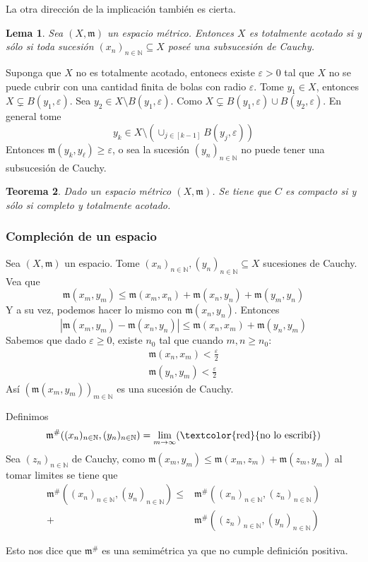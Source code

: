 \documentclass[12pt]{article}
\theoremstyle{plain}
\newtheorem{Th}{Teorema}[subsection]   %
\newtheorem{Lem}[Th]{Lema}             %
\theoremstyle{definition}
\theoremstyle{remark}
\numberwithin{equation}{section}
\newcommand{\bN}{\mathbb{N}}        %
\newcommand{\mm}{\mathfrak{m}}      %
\renewcommand{\geq}{\geqslant}      %
\renewcommand{\leq}{\leqslant}      %
\renewcommand{\:}{\colon}           %
\newcommand{\bonj}[1]{\left\lbrack#1\right\rbrack}
\begin{document}
\begin{multicols}{2}
La otra dirección de la implicación también es cierta.

\begin{Lem}
  Sea $(X,\mm)$ un espacio métrico. Entonces $X$ es totalmente acotado si y sólo si toda sucesión $(x_n)_{n\in\bN}\subseteq X$ poseé una subsucesión de Cauchy.
\end{Lem}

\begin{ptcbp}
Suponga que $X$ no es totalmente acotado, entonecs existe $\varepsilon >0$ tal que $X$ no se puede cubrir con una cantidad finita de bolas con radio $\varepsilon$. Tome $y_1\in X$, entonces $X\subsetneq B(y_1,\varepsilon)$. Sea $y_2\in X\setminus B(y_1,\varepsilon)$. Como $X\subsetneq B(y_1,\varepsilon)\cup B(y_2,\varepsilon)$. En general tome
$$y_k\in X\setminus\left(\cup_{j\in\bonj{k-1}}B(y_j,\varepsilon)\right)$$
Entonces $\mm(y_k,y_\ell)\geq\varepsilon$, o sea la sucesión $(y_n)_{n\in\bN}$ no puede tener una subsucesión de Cauchy.
\end{ptcbp}

\begin{Th}
  Dado un espacio métrico $(X,\mm)$. Se tiene que $C$ es compacto si y sólo si completo y totalmente acotado.
\end{Th}

\subsubsection*{Compleción de un espacio}

Sea $(X,\mm)$ un espacio. Tome $(x_n)_{n\in\bN},(y_n)_{n\in\bN}\subseteq X$ sucesiones de Cauchy. Vea que
$$\mm(x_m,y_m)\leq \mm(x_m,x_n)+\mm(x_n,y_n)+\mm(y_m,y_n)$$
Y a su vez, podemos hacer lo mismo con $\mm(x_n,y_n)$. Entonces
$$|\mm(x_m,y_m)-\mm(x_n,y_n)|\leq \mm(x_n,x_m)+\mm(y_n,y_m)$$
Sabemos que dado $\varepsilon\geq 0$, existe $n_0$ tal que cuando $m,n\geq n_0$:
\begin{gather*}
  \mm(x_n,x_m)<\frac{\varepsilon}{2} \\
  \mm(y_n,y_m)<\frac{\varepsilon}{2}
\end{gather*}
Así $(\mm(x_m,y_m))_{m\in\bN}$ es una sucesión de Cauchy.\par
Definimos
$$\mm^\#((x_n)_{n\in\bN},(y_n)_{n\in\bN})=\lim_{m\to\infty}(\text{\textcolor{red}{no lo escribí}})$$
Sea $(z_n)_{n\in\bN}$ de Cauchy, como $\mm(x_m,y_m)\leq \mm(x_m,z_m)+\mm(z_m,y_m)$ al tomar limites se tiene que
\begin{align*}
  \mm^\#((x_n)_{n\in\bN},(y_n)_{n\in\bN})\leq  & \mm^\#((x_n)_{n\in\bN},(z_n)_{n\in\bN}) \\
   +&\mm^\#((z_n)_{n\in\bN},(y_n)_{n\in\bN})
\end{align*}

Esto nos dice que $\mm^\#$ es una semimétrica ya que no cumple definición positiva.
\end{multicols}
\end{document}
